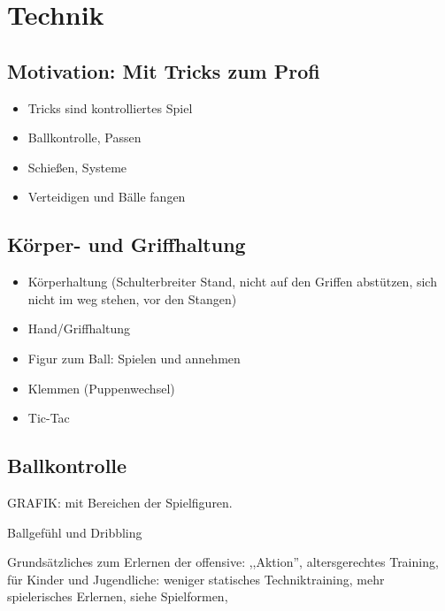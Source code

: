 \chapter{Technik}
\label{technik}

\section{Motivation: Mit Tricks zum Profi}
\label{technik:motivation}

\begin{itemize}
\item Tricks sind kontrolliertes Spiel
\item Ballkontrolle, Passen
\item Schießen, Systeme
\item Verteidigen und Bälle fangen
\end{itemize}

\section{Körper- und Griffhaltung}
\label{technik:haltung}

\begin{itemize}
\item Körperhaltung (Schulterbreiter Stand, nicht auf den Griffen abstützen, sich nicht im weg stehen, vor den Stangen)
\item Hand/Griffhaltung
\end{itemize}




\begin{itemize}
\item Figur zum Ball: Spielen und annehmen
\item Klemmen (Puppenwechsel)
\item Tic-Tac
\end{itemize}


\section{Ballkontrolle}
\label{technik:ballkontrolle}

GRAFIK: mit Bereichen der Spielfiguren.

Ballgefühl und Dribbling

Grundsätzliches zum Erlernen der \gls{offensive}: ,,Aktion'', altersgerechtes Training,  für Kinder und Jugendliche: weniger statisches Techniktraining, mehr spielerisches Erlernen, siehe Spielformen,


